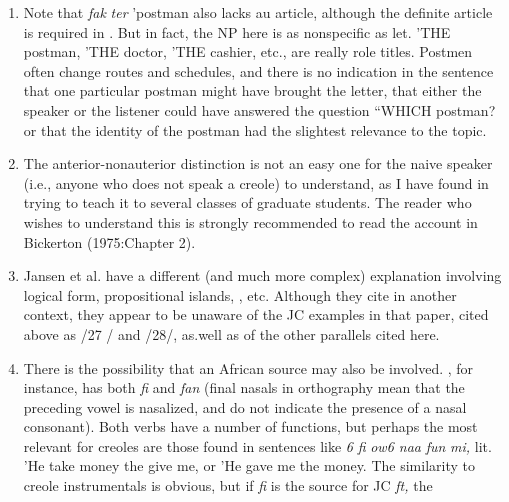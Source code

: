 \begin{enumerate}
\item Note that \textit{fak} \textit{ter} 'postman also lacks au article, although the 
definite article is required in . But in fact, the NP here is as nonspecific as let. 'THE postman, 'THE doctor, 'THE cashier, etc., are really role titles. Postmen often change routes and schedules, and there is no indication in the sentence that one particular postman might have brought the letter, that either the speaker or the listener could have answered the question ``WHICH postman? or that the identity of the postman had the slightest relevance to the topic.
 
\item The anterior-nonauterior distinction is not an easy one for the naive speaker (i.e., anyone who does not speak a creole) to under\-stand, as I have found in trying to teach it to several classes of graduate students. The reader who wishes to understand this is strongly recom\-mended to read the account in Bickerton (1975:Chapter 2).
\item Jansen et al. have a different (and much more complex) explanation involving logical form, propositional islands, , etc. Although they cite \citet{Roberts1975} in another context, they appear to be unaware of the JC examples in that paper, cited above as /27 / and 
/28/, as.well as of the other parallels cited here.
 
\item There is the possibility that an African source may also be involved. , for instance, has both \textit{fi} and \textit{fan }(final nasals in 
 orthography mean that the preceding vowel is nasalized, and do not indicate the presence of a nasal consonant). Both verbs have a number of functions, but perhaps the most relevant for creoles are those found in sentences like \textit{6} \textit{fi} \textit{ow6 naa} \textit{fun} \textit{mi,} lit. 'He take money the give me, or 'He gave me the money. The similarity to creole
instrumentals is obvious, but if  \textit{fi} is the source for JC \textit{ft,} the


\end{enumerate}
